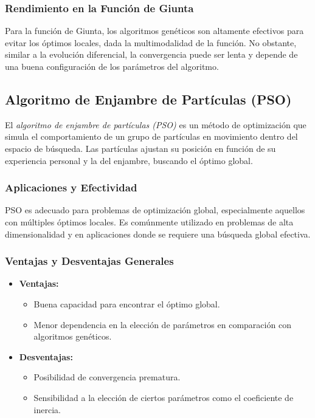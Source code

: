 \documentclass[fontsize=10pt]{article}
\begin{document}
\subsubsection{Rendimiento en la Función de Giunta}

Para la función de Giunta, los algoritmos genéticos son altamente efectivos para evitar los óptimos locales, dada la multimodalidad de la función. No obstante, similar a la evolución diferencial, la convergencia puede ser lenta y depende de una buena configuración de los parámetros del algoritmo.

\subsection{Algoritmo de Enjambre de Partículas (PSO)}

El \textit{algoritmo de enjambre de partículas (PSO)} es un método de optimización que simula el comportamiento de un grupo de partículas en movimiento dentro del espacio de búsqueda. Las partículas ajustan su posición en función de su experiencia personal y la del enjambre, buscando el óptimo global.

\subsubsection{Aplicaciones y Efectividad}

PSO es adecuado para problemas de optimización global, especialmente aquellos con múltiples óptimos locales. Es comúnmente utilizado en problemas de alta dimensionalidad y en aplicaciones donde se requiere una búsqueda global efectiva.

\subsubsection{Ventajas y Desventajas Generales}

\begin{itemize}
    \item \textbf{Ventajas:} 
    \begin{itemize}
        \item Buena capacidad para encontrar el óptimo global.
        \item Menor dependencia en la elección de parámetros en comparación con algoritmos genéticos.
    \end{itemize}
    \item \textbf{Desventajas:} 
    \begin{itemize}
        \item Posibilidad de convergencia prematura.
        \item Sensibilidad a la elección de ciertos parámetros como el coeficiente de inercia.
    \end{itemize}
\end{itemize}
\end{document}
